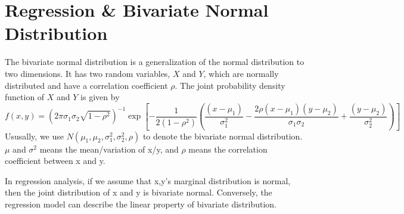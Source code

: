 \documentclass[a4paper]{article}
\begin{document}
\section{Regression \& Bivariate Normal Distribution}
The bivariate normal distribution is a generalization of the normal distribution to two dimensions. It has two random variables, $X$ and $Y$, which are normally distributed and have a correlation coefficient $\rho$. The joint probability density function of $X$ and $Y$ is given by
$$ f(x,y)=(2\pi \sigma_1\sigma_2\sqrt{1-\rho^2})^{-1}\exp [-\frac{1}{2(1-\rho^2)}\left(\frac{(x-\mu_1)}{\sigma_1^2}-\frac{2\rho(x-\mu_1)(y-\mu_2)}{\sigma_1\sigma_2}+\frac{(y-\mu_2)}{\sigma_2^2}\right)] $$
Ususally, we use $N(\mu_1,\mu_2,\sigma_1^2,\sigma_2^2,\rho)$ to denote the bivariate normal distribution. $\mu$ and $\sigma^2$ means the mean/variation of x/y, and $\rho$ means the correlation coefficient between x and y. \par
In regression analysis, if we assume that x,y's marginal distribution is normal, then the joint distribution of x and y is bivariate normal. Conversely, the regression model can describe the linear property of bivariate distribution. \par
\end{document}
